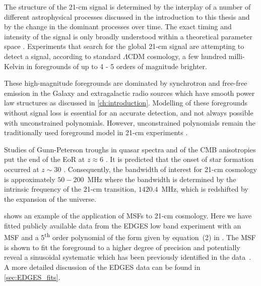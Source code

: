 The structure of the 21-cm signal is determined by the interplay of a number of different astrophysical processes discussed in the introduction to this thesis and by the change in the dominant processes over time. The exact timing and intensity of the signal is only broadly understood within a theoretical parameter space \citep[]{Cohen_global_2017, Singh_saras2_2018, Monsalve_EDGES_HB_3_2019, Cohen2020}. Experiments that search for the global 21-cm signal are attempting to detect a signal, according to standard $\Lambda$CDM cosmology, a few hundred milli-Kelvin in foregrounds of up to 4 - 5 orders of magnitude brighter. 

These high-magnitude foregrounds are dominated by synchrotron and free-free emission in the Galaxy and extragalactic radio sources which have smooth power law structures as discussed in \cref{ch:introduction}. Modelling of these foregrounds without signal loss is essential for an accurate detection, and not always possible with unconstrained polynomials. However, unconstrained polynomials remain the traditionally used foreground model in 21-cm experiments \citep{Bowman_edges_2018, Singh_saras2_2018, Monsalve_EDGES_HB_3_2019}.

Studies of Gunn-Peterson troughs in quasar spectra and of the CMB anisotropies put the end of the EoR at $z\approx6$ \citep{Becker2001, Spergel2007, Planck2018}. It is predicted that the onset of star formation occurred at $z\sim 30$ \citep{Abel2002}. Consequently, the bandwidth of interest for 21-cm cosmology is approximately $50 - 200$~MHz where the bandwidth is determined by the intrinsic frequency of the 21-cm transition, $1420.4$~MHz, which is redshifted by the expansion of the universe. 

 shows an example of the application of MSFs to 21-cm cosmology. Here we have fitted publicly available data from the EDGES low band experiment with an MSF and a 5\textsuperscript{th} order polynomial of the form given by equation~(2) in \cite{Bowman_edges_2018}. The MSF is shown to fit the foreground to a higher degree of precision and potentially reveal a sinusoidal systematic which has been previously identified in the data~\citep{Hills2018, Singh_edges_2019, Sims2020}. A more detailed discussion of the EDGES data can be found in \cref{sec:EDGES_fits}.


